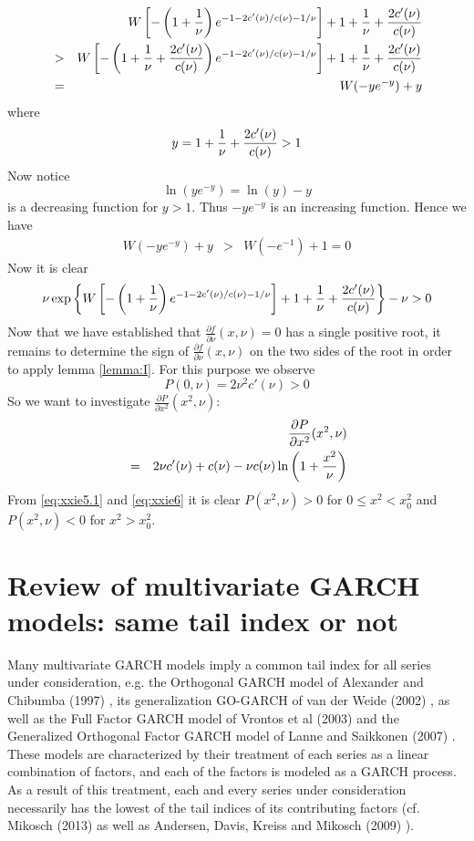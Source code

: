 \documentclass{article}
\newcommand{\pd}[2]{
  \frac{\partial #1}{\partial #2}
}
\newcommand{\1}[1]{
  \mathbf{1}_{\{#1\}}
}
\begin{document}
\begin{eqnarray*}
  &&
  W\left[
    -\left( 1 + {1 \over \nu} \right)
    e^{-1 - 2 c'(\nu)/c(\nu) - 1/\nu}
  \right]
  + 1 + {1 \over \nu} + {2 c'(\nu) \over c(\nu)} \\
  &>& 
  W\left[
    -\left( 1 + {1 \over \nu} + {2 c'(\nu) \over c(\nu)} \right)
    e^{-1 - 2 c'(\nu)/c(\nu) - 1/\nu}
  \right]
  + 1 + {1 \over \nu} + {2 c'(\nu) \over c(\nu)} \\
  &=& W(-y e^{-y}) + y
\end{eqnarray*}
where
\[
y = 1 + {1 \over \nu} + {2 c'(\nu) \over c(\nu)} > 1
\]
Now notice
\[
\ln(y e^{-y}) = \ln(y) - y
\]
is a decreasing function for $y > 1$. Thus $-y e^{-y}$ is an
increasing function. Hence we have
\begin{eqnarray*}
  W(-y e^{-y}) + y &>& W(-e^{-1}) + 1 = 0
\end{eqnarray*}
Now it is clear
\[
\nu\exp\left\{
    W\left[
      -\left(1 + {1 \over \nu}\right)
      e^{-1 - 2 c'(\nu)/c(\nu) - 1/\nu}
    \right]
    + 1 + {1 \over \nu} + {2 c'(\nu) \over c(\nu)}
  \right\} - \nu > 0
\]
Now that we have established that $\pd{f}{\nu}(x, \nu) = 0$ has a
single positive root, it remains to determine the sign of
$\pd{f}{\nu}(x, \nu)$ on the two sides of the root in order to apply
lemma \ref{lemma:I}. For this purpose we observe
\begin{equation}
  \label{eq:xxie5.1}
  P(0, \nu) = 2 \nu^2 c'(\nu) > 0
\end{equation}
So we want to investigate $\pd{P}{x^2}(x^2, \nu)$:
\begin{eqnarray}
  && \pd{P}{x^2}(x^2, \nu) \nonumber \\
  &=&
  2 \nu c'(\nu) + c(\nu) - \nu c(\nu) \ln\left(
  1 + {x^2 \over \nu}
  \right)
  \label{eq:xxie6}
\end{eqnarray}
From \eqref{eq:xxie5.1} and \eqref{eq:xxie6} it is clear
$P(x^2, \nu) > 0$ for $0 \leq x^2 < x_0^2$ and
$P(x^2, \nu) < 0$ for $x^2 > x_0^2$.


\section{Review of multivariate GARCH models:
  same tail index or not}
Many multivariate GARCH models imply a common tail index for all
series under consideration, e.g. the Orthogonal GARCH model of
Alexander and Chibumba (1997) \cite{alexander1997multivariate}, its
generalization GO-GARCH of van der Weide (2002) \cite{van2002go}, as
well as the Full Factor GARCH model of Vrontos et al (2003)
\cite{vrontos2003full} and the Generalized Orthogonal Factor GARCH
model of Lanne and Saikkonen (2007) \cite{lanne2007modeling}. These
models are characterized by their treatment of each series as a linear
combination of factors, and each of the factors is modeled as a GARCH
process. As a result of this treatment, each and every series under
consideration necessarily has the lowest of the tail indices of its
contributing factors (cf. Mikosch (2013) \cite{Mikosch2013} as well
as Andersen, Davis, Kreiss and Mikosch (2009)
\cite{andersen2009handbook}).
\end{document}

